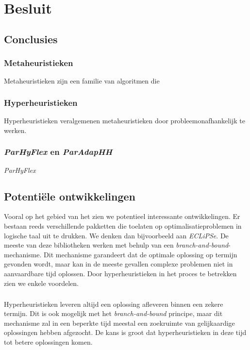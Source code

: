 \chapter{Besluit}
\label{besluit}


\section{Conclusies}

\subsection{Metaheuristieken}
Metaheuristieken zijn een familie van algoritmen die 

\subsection{Hyperheuristieken}

Hyperheuristieken veralgemenen metaheuristieken door probleemonafhankelijk te werken.

\subsection{\emph{ParHyFlex} en \emph{ParAdapHH}}

\emph{ParHyFlex} 

\section{Potenti\"ele ontwikkelingen}

Vooral op het gebied van het  zien we potentieel interessante ontwikkelingen. Er bestaan reeds verschillende pakketten die toelaten op optimalisatieproblemen in logische taal uit te drukken. We denken dan bijvoorbeeld aan \emph{ECLiPSe}. De meeste van deze bibliotheken werken met behulp van een \emph{branch-and-bound}-mechanisme. Dit mechanisme garandeert dat de optimale oplossing op termijn gevonden wordt, maar kan in de meeste gevallen complexe problemen niet in aanvaardbare tijd oplossen. Door hyperheuristieken in het proces te betrekken zien we enkele voordelen.

\paragraph{}
Hyperheuristieken leveren altijd een oplossing afleveren binnen een zekere termijn. Dit is ook mogelijk met het \emph{branch-and-bound} principe, maar dit mechanisme zal in een beperkte tijd meestal een zoekruimte van gelijkaardige oplossingen hebben afgezocht. De kans is groot dat hyperheuristieken in deze tijd tot betere oplossingen komen.

